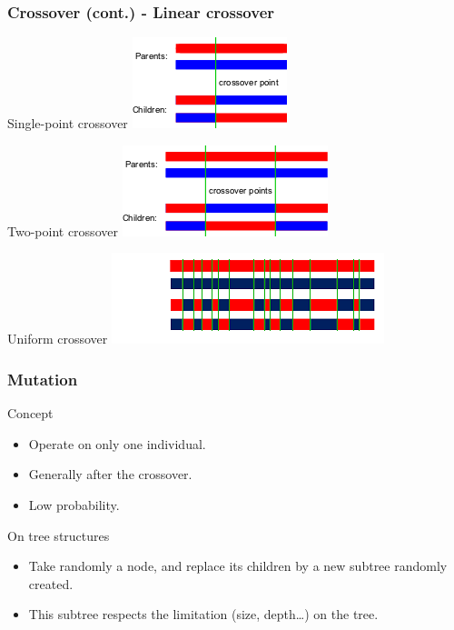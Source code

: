 \begin{frame}
  \frametitle{Crossover (cont.) - Linear crossover}
  \begin{block}{Single-point crossover}
    \centering\includegraphics[scale=.5]{img/SinglePointCrossover}
  \end{block}

  \begin{block}{Two-point crossover}
    \centering\includegraphics[scale=.5]{img/TwoPointCrossover}
  \end{block}

  \begin{block}{Uniform crossover}
    \centering\includegraphics[scale=.55]{img/uniformcrossover}
  \end{block}
\end{frame}

\begin{frame}
  \frametitle{Mutation}
  \begin{block}{Concept}
    \begin{itemize}
    \item Operate on only one individual.
    \item Generally after the crossover.
    \item Low probability.
    \end{itemize}
  \end{block}

  \begin{block}{On tree structures}
    \begin{itemize}
    \item Take randomly a node, and replace its children by a new subtree
      randomly created.
    \item This subtree respects the limitation (size, depth\dots) on
      the tree.
    \end{itemize}
  \end{block}
\end{frame}

